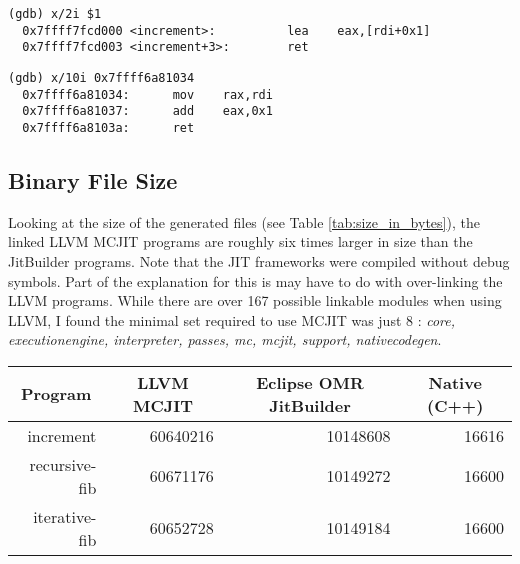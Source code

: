 \begin{lstlisting}[float,floatplacement=H,
  caption={llvm increment disassembly (Optimization level 3)},
  label=lst:llvm_increment_assembly]
(gdb) x/2i $1                                                                                                     
  0x7ffff7fcd000 <increment>:          lea    eax,[rdi+0x1]
  0x7ffff7fcd003 <increment+3>:        ret
\end{lstlisting}

\begin{lstlisting}[float,floatplacement=H,
  caption={jitbuilder increment disassembly (Optimization level \textit{Warm})},
  label=lst:llvm_increment_assembly]
(gdb) x/10i 0x7ffff6a81034
  0x7ffff6a81034:      mov    rax,rdi
  0x7ffff6a81037:      add    eax,0x1
  0x7ffff6a8103a:      ret 
\end{lstlisting}

\subsection{Binary File Size}
Looking at the size of the generated files (see Table \ref{tab:size_in_bytes}), the linked LLVM MCJIT programs are roughly six times larger in size than the JitBuilder programs.
Note that the JIT frameworks were compiled without debug symbols.
Part of the explanation for this is may have to do with over-linking the LLVM programs.
While there are over 167 possible linkable modules when using LLVM, I found the minimal set required to use MCJIT was just 8 : \textit{core, executionengine, interpreter, passes, mc, mcjit, support, nativecodegen}.

\begin{table*}[t]
  \begin{tabular}{|r|l|l|l|} 
  \hline
  \multicolumn{1}{|c|}{\textbf{Program}}
  & \multicolumn{1}{c|}{\textbf{LLVM MCJIT}}                      & \multicolumn{1}{c|}{\textbf{Eclipse OMR JitBuilder}}
  & \multicolumn{1}{c|}{\textbf{Native (C++)}}                    \\ \hline

  increment                               
  & \multicolumn{1}{r|}{\num{60640216}} %
  & \multicolumn{1}{r|}{\num{10148608}} %
  & \multicolumn{1}{r|}{\num{16616}}    %
  \\ \hline
  
  recursive-fib                           
  & \multicolumn{1}{r|}{\num{60671176}} %
  & \multicolumn{1}{r|}{\num{10149272}} %
  & \multicolumn{1}{r|}{\num{16600}}   %
  \\ \hline
  
  iterative-fib                           
  & \multicolumn{1}{r|}{\num{60652728}} %
  & \multicolumn{1}{r|}{\num{10149184}} %
  & \multicolumn{1}{r|}{\num{16600}}   %
  \\ \hline
  
\end{tabular}
  \caption{Total size in bytes of linked binary test programs.}
  \label{tab:size_in_bytes}
\end{table*}

